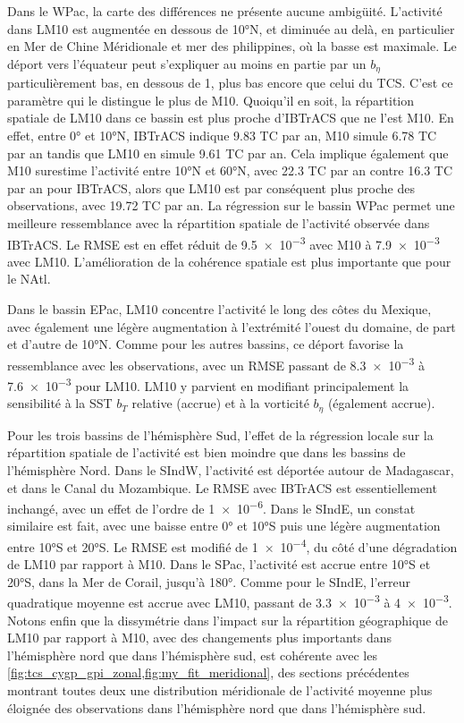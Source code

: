 \documentclass[../main.tex]{subfiles}
\begin{document}
Dans le WPac, la carte des différences ne présente aucune ambigüité. L'activité dans LM10 est augmentée en dessous de \ang{10}N, et diminuée au delà, en
particulier en Mer de Chine Méridionale et mer des philippines, où la basse est maximale. Le déport vers l'équateur peut s'expliquer au moins en partie par un
$b_\eta$ particulièrement bas, en dessous de \num{1}, plus bas encore que celui du TCS. C'est ce paramètre qui le distingue le plus de M10. Quoiqu'il en soit,
la répartition spatiale de LM10 dans ce bassin est plus proche d'IBTrACS que ne l'est M10. En effet, entre \ang{0} et \ang{10}N, IBTrACS indique \num{9.83} TC
par an, M10 simule \num{6.78} TC par an tandis que LM10 en simule \num{9.61} TC par an. Cela implique également que M10 surestime l'activité entre \ang{10}N et
\ang{60}N, avec \num{22.3} TC par an contre \num{16.3} TC par an pour IBTrACS, alors que LM10 est par conséquent plus proche des observations, avec \num{19.72}
TC par an. La régression sur le bassin WPac permet une meilleure ressemblance avec la répartition spatiale de l'activité observée dans IBTrACS. Le RMSE
est en effet réduit de \num{9.5e-3} avec M10 à \num{7.9e-3} avec LM10. L'amélioration de la cohérence spatiale est plus importante que pour le NAtl.

Dans le bassin EPac, LM10 concentre l'activité le long des côtes du Mexique, avec également une légère augmentation à l'extrémité l'ouest du domaine, de part et
d'autre de \ang{10}N. Comme pour les autres bassins, ce déport favorise la ressemblance avec les observations, avec un RMSE passant de \num{8.3e-3} à \num{7.6e-3} pour
LM10. LM10 y parvient en modifiant principalement la sensibilité à la SST $b_T$ relative (accrue) et à la vorticité $b_\eta$ (également accrue).

Pour les trois bassins de l'hémisphère Sud, l'effet de la régression locale sur la répartition spatiale de l'activité est bien moindre que dans les bassins de
l'hémisphère Nord. Dans le SIndW, l'activité est déportée autour de Madagascar, et dans le Canal du Mozambique. Le RMSE avec IBTrACS est essentiellement
inchangé, avec un effet de l'ordre de \num{1e-6}. Dans le SIndE, un constat similaire est fait, avec une baisse entre \ang{0} et \ang{10}S puis une légère
augmentation entre \ang{10}S et \ang{20}S. Le RMSE est modifié de \num{1e-4}, du côté d'une dégradation de LM10 par rapport à M10. Dans le SPac, l'activité est
accrue entre \ang{10}S et \ang{20}S, dans la Mer de Corail, jusqu'à \ang{180}. Comme pour le SIndE, l'erreur quadratique moyenne est accrue avec LM10, passant
de \num{3.3e-3} à \num{4e-3}. Notons enfin que la dissymétrie dans l'impact sur la répartition géographique de LM10 par rapport à M10, avec des changements plus
importants dans l'hémisphère nord que dans l'hémisphère sud, est cohérente avec les \cref{fig:tcs_cygp_gpi_zonal,fig:my_fit_meridional}, des sections
précédentes montrant toutes deux une distribution méridionale de l'activité moyenne plus éloignée des observations dans l'hémisphère nord que dans l'hémisphère
sud.
\end{document}
